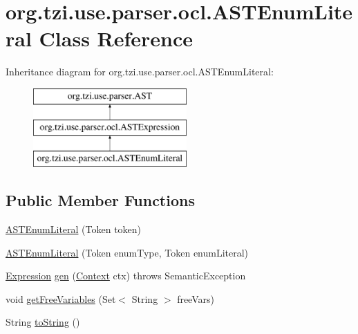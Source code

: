 \hypertarget{classorg_1_1tzi_1_1use_1_1parser_1_1ocl_1_1_a_s_t_enum_literal}{\section{org.\-tzi.\-use.\-parser.\-ocl.\-A\-S\-T\-Enum\-Literal Class Reference}
\label{classorg_1_1tzi_1_1use_1_1parser_1_1ocl_1_1_a_s_t_enum_literal}
}
Inheritance diagram for org.\-tzi.\-use.\-parser.\-ocl.\-A\-S\-T\-Enum\-Literal\-:\begin{figure}[H]
\begin{center}
\leavevmode
\includegraphics[height=3.000000cm]{classorg_1_1tzi_1_1use_1_1parser_1_1ocl_1_1_a_s_t_enum_literal}
\end{center}
\end{figure}
\subsection*{Public Member Functions}
\begin{DoxyCompactItemize}
\item 
\hyperlink{classorg_1_1tzi_1_1use_1_1parser_1_1ocl_1_1_a_s_t_enum_literal_a4fbaba8074a7b3fa11c8fa46a6a26cdb}{A\-S\-T\-Enum\-Literal} (Token token)
\item 
\hyperlink{classorg_1_1tzi_1_1use_1_1parser_1_1ocl_1_1_a_s_t_enum_literal_a8c5a77c701d79c2f61671aa452143f61}{A\-S\-T\-Enum\-Literal} (Token enum\-Type, Token enum\-Literal)
\item 
\hyperlink{classorg_1_1tzi_1_1use_1_1uml_1_1ocl_1_1expr_1_1_expression}{Expression} \hyperlink{classorg_1_1tzi_1_1use_1_1parser_1_1ocl_1_1_a_s_t_enum_literal_a89a150f5446ff7c42b2f9fc35e7d2e62}{gen} (\hyperlink{classorg_1_1tzi_1_1use_1_1parser_1_1_context}{Context} ctx)  throws Semantic\-Exception 
\item 
void \hyperlink{classorg_1_1tzi_1_1use_1_1parser_1_1ocl_1_1_a_s_t_enum_literal_a28b05cfa267571a6ad0a6a56212f7028}{get\-Free\-Variables} (Set$<$ String $>$ free\-Vars)
\item 
String \hyperlink{classorg_1_1tzi_1_1use_1_1parser_1_1ocl_1_1_a_s_t_enum_literal_aefa314ea87e4016cd2ff80e3c7d9b987}{to\-String} ()
\end{DoxyCompactItemize}
